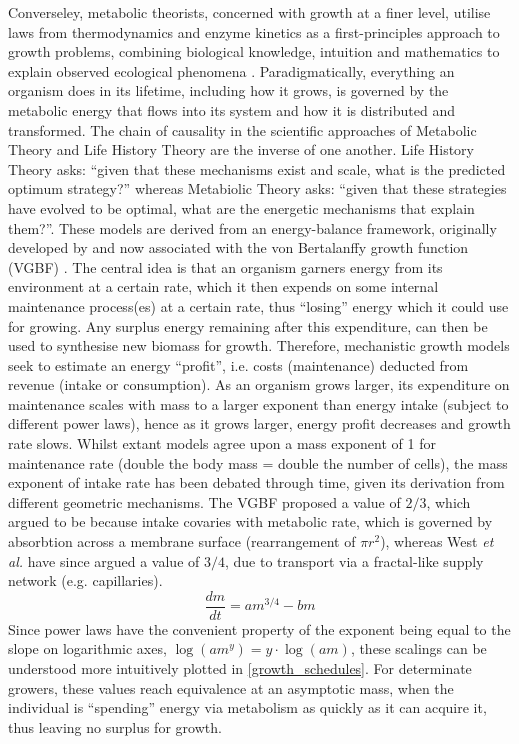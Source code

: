 \documentclass[a4paper]{article} %
\begin{document}
    Converseley, metabolic theorists, concerned with growth at a finer level, utilise laws from thermodynamics and enzyme kinetics as a first-principles approach to growth problems, combining biological knowledge, intuition and mathematics to explain observed ecological phenomena \autocite{Brown2004}. Paradigmatically, everything an organism does in its lifetime, including how it grows, is governed by the metabolic energy that flows into its system and how it is distributed and transformed. The chain of causality in the scientific approaches of Metabolic Theory and Life History Theory are the inverse of one another. Life History Theory asks: ``given that these mechanisms exist and scale, what is the predicted optimum strategy?'' whereas Metabiolic Theory asks: ``given that these strategies have evolved to be optimal, what are the energetic mechanisms that explain them?''. These models are derived from an energy-balance framework, originally developed by \cite{Putter1920} and now associated with the von Bertalanffy growth function (VGBF) \autocite{vonBert1938, VonBertalanffy1957}. The central idea is that an organism garners energy from its environment at a certain rate, which it then expends on some internal maintenance process(es) at a certain rate, thus ``losing'' energy which it could use for growing. Any surplus energy remaining after this expenditure, can then be used to synthesise new biomass for growth.  Therefore, mechanistic growth models seek to estimate an energy ``profit'', i.e. costs (maintenance) deducted from revenue (intake or consumption). As an organism grows larger, its expenditure on maintenance scales with mass to a larger exponent than energy intake (subject to different power laws), hence as it grows larger, energy profit decreases and growth rate slows. Whilst extant models agree upon a mass exponent of 1 for maintenance rate (double the body mass = double the number of cells), the mass exponent of intake rate has been debated through time, given its derivation from different geometric mechanisms. The VGBF proposed a value of $2/3$, which \cite{vonBert1938} argued to be because intake covaries with metabolic rate, which is governed by absorbtion across a membrane surface (rearrangement of $\pi r^2$), whereas West \textit{et al.} have since argued a value of $3/4$, due to transport via a fractal-like supply network (e.g. capillaries). 
    \begin{equation}
        \frac{dm}{dt} = am^{3/4} - bm \label{west_ogm}
    \end{equation}
    Since power laws have the convenient property of the exponent being equal to the slope on logarithmic axes, $\log{(am^y)} = y\cdot \log{(am)}$, these scalings can be understood more intuitively plotted in \ref{growth_schedules}. For determinate growers, these values reach equivalence at an asymptotic mass, when the individual is ``spending'' energy via metabolism as quickly as it can acquire it, thus leaving no surplus for growth.
\end{document}

